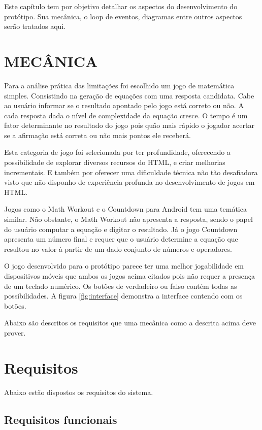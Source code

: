Este capítulo tem por objetivo detalhar os aspectos do desenvolvimento
do protótipo. Sua mecânica, o loop de eventos, diagramas entre outros
aspectos serão tratados aqui.

\section{MECÂNICA}

Para a análise prática das limitações foi escolhido um jogo de
matemática simples. Consistindo na geração de equações com uma
resposta candidata. Cabe ao usuário informar se o resultado apontado
pelo jogo está correto ou não. A cada resposta dada o nível de
complexidade da equação cresce. O tempo é um fator determinante
no resultado do jogo pois quão mais rápido o jogador acertar se a
afirmação está correta ou não mais pontos ele receberá.

Esta categoria de jogo foi selecionada por ter profundidade, oferecendo
a possibilidade de explorar diversos recursos do HTML, e criar melhorias
incrementais. E também por oferecer uma dificuldade técnica não
tão desafiadora visto que não disponho de experiência profunda no
desenvolvimento de jogos em HTML.

Jogos como o Math Workout e o Countdown para Android tem uma temática
similar. Não obstante, o Math Workout não apresenta a resposta, sendo
o papel do usuário computar a equação e digitar o resultado. Já o jogo
Countdown apresenta um número final e requer que o usuário determine
a equação que resultou no valor à partir de um dado conjunto de
números e operadores.

O jogo desenvolvido para o protótipo parece ter uma melhor jogabilidade
em dispositivos móveis que ambos os jogos acima citados pois não
requer a presença de um teclado numérico. Os botões de verdadeiro
ou falso contém todas as possibilidades. A figura \ref{fig:interface}
demonstra a interface contendo com os botões.

Abaixo são descritos os requisitos que uma mecânica como a descrita 
acima deve prover.

\section{Requisitos}

Abaixo estão dispostos os requisitos do sistema.

\subsection{Requisitos funcionais}

